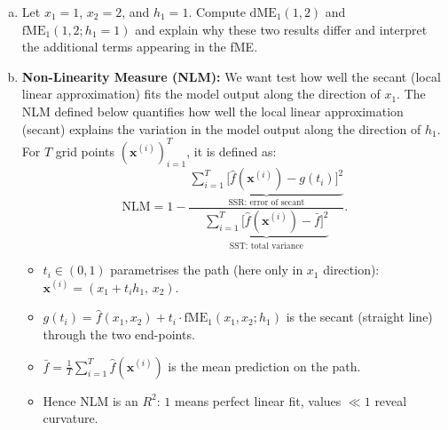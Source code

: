 {\begin{enumerate}[a)]
  \item Let \( x_1 = 1 \), \( x_2 = 2 \), and \( h_1 = 1 \). Compute \( \text{dME}_1(1, 2) \) and \( \text{fME}_1(1, 2; h_1 = 1) \) and explain why these two results differ and interpret the additional terms appearing in the fME.
% 
  \item \textbf{Non-Linearity Measure (NLM):} We want test how well the secant (local linear approximation) fits the model output along the direction of $x_1$. The NLM defined below quantifies how well the local linear approximation (secant) explains the variation in the model output along the direction of $h_1$. For $T$ grid points $(\mathbf x^{(i)})_{i=1}^{T}$, it is defined as:
\[
  \mathrm{NLM}
  = 1 -
    \frac{\displaystyle
          \underbrace{\sum_{i=1}^{T}
            \bigl[\hat f(\mathbf x^{(i)})-g(t_i)\bigr]^2}_{\text{SSR: error of secant}}}
         {\displaystyle
          \underbrace{\sum_{i=1}^{T}
            \bigl[\hat f(\mathbf x^{(i)})-\bar f\bigr]^2}_{\text{SST: total variance}}}.
\]
\begin{itemize}\setlength\itemsep{0.2em}
  \item $\displaystyle t_i \in (0,1)$ param\-e\-tri\-ses the path (here only in $x_1$ direction):
        \(\mathbf x^{(i)} = (x_1 + t_i h_1,\,x_2)\).
  \item $\displaystyle g(t_i)
        = \hat f(x_1,x_2)
        + t_i\cdot\text{fME}_1(x_1,x_2;h_1)$  
        is the secant (straight line) through the two end-points.
  \item $\displaystyle\bar f
        = \frac1T \sum_{i=1}^{T}\hat f(\mathbf x^{(i)})$
        is the mean prediction on the path.
  \item Hence NLM is an $R^{2}$: $1$ means perfect linear fit,
        values $\ll 1$ reveal curvature.
\end{itemize}


\end{enumerate}}
